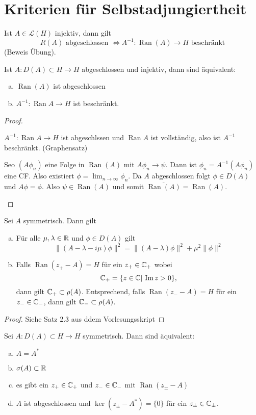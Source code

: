 \documentclass{mycourse}
\newcommand{\Ran}{\operatorname{Ran}}
\begin{document}
\chapter{Kriterien für Selbstadjungiertheit}
Ist $A\in \mathcal L(H)$ injektiv, dann gilt
\[
R(A) \text{ abgeschlossen } \iff A^{-1}: \Ran(A) \to H \text{ beschränkt}
\]
(Beweis Übung).
\begin{lem}
Ist $A: D(A) \subset H \to H$ abgeschlossen und injektiv, dann sind äquivalent:
\begin{enumerate}[a)]
\item $\Ran(A)$ ist abgeschlossen
\item $A^{-1}: \Ran A \to H$ ist beschränkt.
\end{enumerate}
\end{lem}
\begin{proof}
\begin{seg}[(a) $\implies$ (b)] 
$A^{-1}: \Ran A \to H$ ist abgeschlssen und $\Ran A$ ist vollständig, also ist $A^{-1}$ beschränkt. (Graphensatz)
\end{seg}
\begin{seg}[(b) $\implies$ (a)]
Seo $(A\phi_n)$ eine Folge in $\Ran(A)$ mit $A\phi_n \to \psi$. Dann ist $\phi_n = A^{-1}(A\phi_n)$ eine CF. Also existiert $\phi = \lim_{n\to \infty} \phi_n$. Da $A$ abgeschlossen folgt $\phi \in D(A)$ und $A\phi =  \phi$. Also $\psi \in \Ran(A)$ und somit $\overline{\Ran(A)}=\Ran(A)$.
\end{seg}
\end{proof}
\begin{st}
Sei $A$ symmetrisch. Dann gilt 
\begin{enumerate}[a)]
\item Für alle $\mu, \lambda\in \mathbb{R}$ und $\phi \in D(A)$ gilt
\[
\| (A-\lambda-i \mu) \phi \|^2 = \| (A-\lambda) \phi\|^2 + \mu^2 \| \phi\|^2
\]
\item Falls $\Ran(z_+-A)=H$ für ein $z_+ \in \mathbb{C}_+$ wobei
\[
\mathbb{C}_+ = \{z\in \mathbb{C} | \, \operatorname{Im} z > 0 \},
\]
dann gilt $\mathbb{C}_+\subset \rho(A)$. Entsprechend, falls $\Ran(z_- -A) =H$ für ein $z_- \in \mathbb{C}_-$, dann gilt $\mathbb{C}_-\subset \rho(A)$.
\end{enumerate}
\end{st}
\begin{proof}
Siehe Satz 2.3 aus ddem Vorlesungsskript
\end{proof}
\begin{st}
Sei $A: D(A)\subset H \to H$ symmetrisch. Dann sind äquivalent:
\begin{enumerate}[a)]
\item $A=A^*$
\item $\sigma(A)\subset \mathbb{R}$
\item es gibt ein $z_+\in \mathbb{C}_+$ und $z_-\in \mathbb{C}_-$ mit $\Ran(z_\pm-A)$
\item $A$ ist abgeschlossen und $\ker(z_\pm- A^*) =\{0\}$ für ein $z_\pm\in \mathbb{C}_\pm$.
\end{enumerate}
\end{st}
\end{document}
